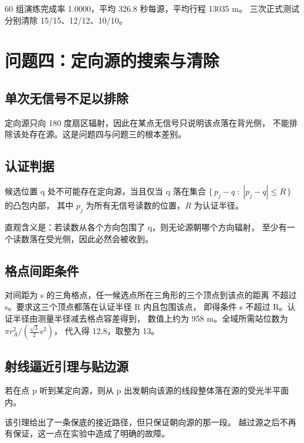 60 组演练完成率 1.0000，平均 326.8 秒每源，平均行程 13035 m。
三次正式测试分别清除 15/15、12/12、10/10。

\section{问题四：定向源的搜索与清除}

\subsection{单次无信号不足以排除}

定向源只向 180 度扇区辐射，因此在某点无信号只说明该点落在背光侧，
不能排除该处存在源。这是问题四与问题三的根本差别。

\subsection{认证判据}

\begin{keybox}[title=定理]
候选位置 q 处不可能存在定向源，当且仅当 q 落在集合
$\{\,p_j - q \;:\; |p_j - q| \le R\,\}$ 的凸包内部，
其中 $p_j$ 为所有无信号读数的位置，$R$ 为认证半径。
\end{keybox}

直观含义是：若读数从各个方向包围了 q，则无论源朝哪个方向辐射，
至少有一个读数落在受光侧，因此必然会被收到。

\subsection{格点间距条件}

对间距为 s 的三角格点，任一候选点所在三角形的三个顶点到该点的距离
不超过 s。要求这三个顶点都落在认证半径 R 内且包围该点，
即得条件 s 不超过 R。认证半径由测量半径减去格点容差得到，
数值上约为 958 m。全域所需站位数为 $\pi r_A^2 / (\frac{\sqrt3}{2} s^2)$，
代入得 12.8，取整为 13。

\subsection{射线逼近引理与贴边源}

\begin{keybox}[title=引理]
若在点 p 听到某定向源，则从 p 出发朝向该源的线段整体落在源的受光半平面内。
\end{keybox}

该引理给出了一条保底的接近路径，但只保证朝向源的那一段。
越过源之后不再有保证，这一点在实验中造成了明确的故障。

